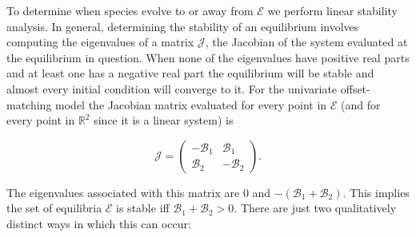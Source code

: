 \documentclass[]{article}
\begin{document}
To determine when species evolve to or away from \(\mathscr{E}\) we
perform linear stability analysis. In general, determining the stability
of an equilibrium involves computing the eigenvalues of a matrix
\(\mathscr{J}\), the Jacobian of the system evaluated at the equilibrium
in question. When none of the eigenvalues have positive real parts and
at least one has a negative real part the equilibrium will be stable and
almost every initial condition will converge to it. For the univariate
offset-matching model the Jacobian matrix evaluated for every point in
\(\mathscr{E}\) (and for every point in \(\mathbb{R}^2\) since it is a
linear system) is

\begin{equation}
\mathscr{J}=\left(\begin{matrix}-\mathscr{B}_1&\mathscr{B}_1\\\mathscr{B}_2&-\mathscr{B}_2\end{matrix}\right).
\end{equation}

The eigenvalues associated with this matrix are \(0\) and
\(-(\mathscr{B}_1+\mathscr{B}_2)\). This implies the set of equilibria
\(\mathscr{E}\) is stable iff \(\mathscr{B}_1+\mathscr{B}_2>0\). There
are just two qualitatively distinct ways in which this can occur:
\end{document}
